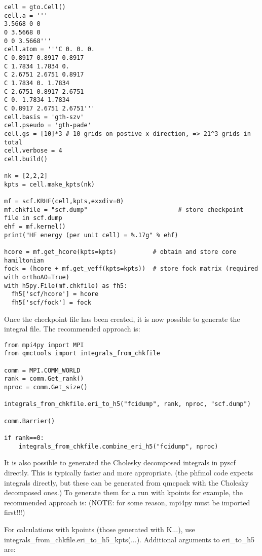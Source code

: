 \begin{itemize}
\begin{lstlisting}[caption=The following is an example PySCF input file for calculations with k-points.]
cell = gto.Cell()
cell.a = '''
3.5668 0 0
0 3.5668 0
0 0 3.5668'''
cell.atom = '''C 0. 0. 0. 
C 0.8917 0.8917 0.8917
C 1.7834 1.7834 0. 
C 2.6751 2.6751 0.8917
C 1.7834 0. 1.7834
C 2.6751 0.8917 2.6751
C 0. 1.7834 1.7834
C 0.8917 2.6751 2.6751'''
cell.basis = 'gth-szv'
cell.pseudo = 'gth-pade'
cell.gs = [10]*3 # 10 grids on postive x direction, => 21^3 grids in total
cell.verbose = 4
cell.build()

nk = [2,2,2]
kpts = cell.make_kpts(nk) 

mf = scf.KRHF(cell,kpts,exxdiv=0)
mf.chkfile = "scf.dump"                         # store checkpoint file in scf.dump
ehf = mf.kernel()
print("HF energy (per unit cell) = %.17g" % ehf)

hcore = mf.get_hcore(kpts=kpts)          # obtain and store core hamiltonian
fock = (hcore + mf.get_veff(kpts=kpts))  # store fock matrix (required with orthoAO=True)
with h5py.File(mf.chkfile) as fh5:
  fh5['scf/hcore'] = hcore
  fh5['scf/fock'] = fock
\end{lstlisting}
\end{itemize}

Once the checkpoint file has been created, it is now possible to generate the integral file. The recommended approach is:

\begin{lstlisting}[caption=The following is an example input file for calculating the integrals.]
from mpi4py import MPI
from qmctools import integrals_from_chkfile

comm = MPI.COMM_WORLD
rank = comm.Get_rank()
nproc = comm.Get_size()

integrals_from_chkfile.eri_to_h5("fcidump", rank, nproc, "scf.dump")    

comm.Barrier()

if rank==0:
    integrals_from_chkfile.combine_eri_h5("fcidump", nproc)
\end{lstlisting}

It is also possible to generated the Cholesky decomposed integrals in pyscf directly. This is typically faster and more appropriate. (the phfmol code expects integrals directly, but these can be generated from qmcpack with the Cholesky decomposed ones.) To generate them for a run with kpoints for example, the recommended approach is: (NOTE: for some reason, mpi4py must be imported first!!!)

For calculations with kpoints (those generated with K...), use integrals\_from\_chkfile.eri\_to\_h5\_kpts(...).
Additional arguments to eri\_to\_h5 are:

